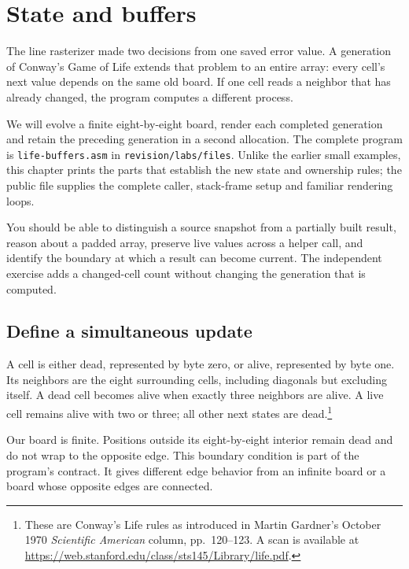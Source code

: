 \chapter{State and buffers}
\label{revision:state-and-buffers}

The line rasterizer made two decisions from one saved error value. A generation
of Conway's Game of Life extends that problem to an entire array: every cell's
next value depends on the same old board. If one cell reads a neighbor that has
already changed, the program computes a different process.

We will evolve a finite eight-by-eight board, render each completed generation
and retain the preceding generation in a second allocation. The complete program
is \texttt{life-buffers.asm} in \texttt{revision/labs/files}. Unlike the earlier
small examples, this chapter prints the parts that establish the new state and
ownership rules; the public file supplies the complete caller, stack-frame setup
and familiar rendering loops.

You should be able to distinguish a source snapshot from a partially built result,
reason about a padded array, preserve live values across a helper call, and identify
the boundary at which a result can become current. The independent exercise adds
a changed-cell count without changing the generation that is computed.

\section{Define a simultaneous update}

A cell is either dead, represented by byte zero, or alive, represented by byte one.
Its neighbors are the eight surrounding cells, including diagonals but excluding
itself. A dead cell becomes alive when exactly three neighbors are alive. A live
cell remains alive with two or three; all other next states are dead.\footnote{These
  are Conway's Life rules as introduced in Martin Gardner's October 1970
  \emph{Scientific American} column, pp.~120--123. A scan is available at
  \url{https://web.stanford.edu/class/sts145/Library/life.pdf}.}

Our board is finite. Positions outside its eight-by-eight interior remain dead
and do not wrap to the opposite edge. This boundary condition is part of the
program's contract. It gives different edge behavior from an infinite board or
a board whose opposite edges are connected.

